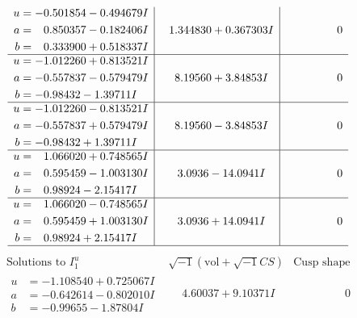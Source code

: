 \documentclass[1p]{elsarticle_modified}
\theoremstyle{definition}
\newcommand{\I}{\sqrt{-1}}
\begin{document}
$$\begin{array}{c|c|c}
\begin{aligned}
u &= -0.501854 - 0.494679 I \\
a &= \phantom{-}0.850357 - 0.182406 I \\
b &= \phantom{-}0.333900 + 0.518337 I\end{aligned}
 & \phantom{-}1.344830 + 0.367303 I & \phantom{-0.000000 } 0 \\ \hline\begin{aligned}
u &= -1.012260 + 0.813521 I \\
a &= -0.557837 - 0.579479 I \\
b &= -0.98432 - 1.39711 I\end{aligned}
 & \phantom{-}8.19560 + 3.84853 I & \phantom{-0.000000 } 0 \\ \hline\begin{aligned}
u &= -1.012260 - 0.813521 I \\
a &= -0.557837 + 0.579479 I \\
b &= -0.98432 + 1.39711 I\end{aligned}
 & \phantom{-}8.19560 - 3.84853 I & \phantom{-0.000000 } 0 \\ \hline\begin{aligned}
u &= \phantom{-}1.066020 + 0.748565 I \\
a &= \phantom{-}0.595459 - 1.003130 I \\
b &= \phantom{-}0.98924 - 2.15417 I\end{aligned}
 & \phantom{-}3.0936 - 14.0941 I & \phantom{-0.000000 } 0 \\ \hline\begin{aligned}
u &= \phantom{-}1.066020 - 0.748565 I \\
a &= \phantom{-}0.595459 + 1.003130 I \\
b &= \phantom{-}0.98924 + 2.15417 I\end{aligned}
 & \phantom{-}3.0936 + 14.0941 I & \phantom{-0.000000 } 0\\
 \hline 
 \end{array}$$\newpage$$\begin{array}{c|c|c}  
\text{Solutions to }I^u_{1}& \I (\text{vol} + \sqrt{-1}CS) & \text{Cusp shape}\\
 \hline 
\begin{aligned}
u &= -1.108540 + 0.725067 I \\
a &= -0.642614 - 0.802010 I \\
b &= -0.99655 - 1.87804 I\end{aligned}
 & \phantom{-}4.60037 + 9.10371 I & \phantom{-0.000000 } 0 \\ \hline\begin{aligned}

\end{aligned}
\end{array}$$
\end{document}

